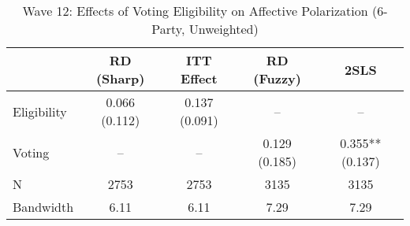 \begin{table}[htbp]
\centering
\caption{Wave 12: Effects of Voting Eligibility on Affective Polarization (6-Party, Unweighted)}
\label{tab:wave12_l6_un}
\begin{tabular}{lcccc}
\hline
 & RD (Sharp) & ITT Effect & RD (Fuzzy) & 2SLS \\
\hline
Eligibility & 0.066 (0.112) & 0.137 (0.091) & -- & -- \\
Voting & -- & -- & 0.129 (0.185) & 0.355** (0.137) \\
\hline
N & 2753 & 2753 & 3135 & 3135 \\
Bandwidth & 6.11 & 6.11 & 7.29 & 7.29 \\
\hline
\end{tabular}
\end{table}
